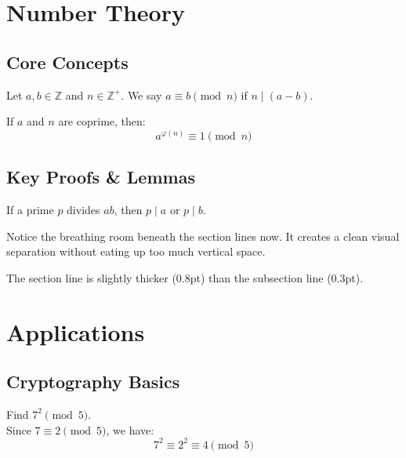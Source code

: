 \section{Number Theory}

\subsection{Core Concepts}

\begin{definition}
    Let $a, b \in \mathbb{Z}$ and $n \in \mathbb{Z}^+$. We say $a \equiv b \pmod n$ if $n \mid (a-b)$.
\end{definition}

\begin{theorem}
    If $a$ and $n$ are coprime, then:
    $$ a^{\varphi(n)} \equiv 1 \pmod n $$
\end{theorem}

\subsection{Key Proofs \& Lemmas}

\begin{lemma}
    If a prime $p$ divides $ab$, then $p \mid a$ or $p \mid b$.
\end{lemma}

\begin{remark}
    Notice the breathing room beneath the section lines now. It creates a clean visual separation without eating up too much vertical space.
\end{remark}

\begin{important}
    The section line is slightly thicker (0.8pt) than the subsection line (0.3pt).
\end{important}

\section{Applications}

\subsection{Cryptography Basics}

\begin{example}
    Find $7^2 \pmod 5$. \\
    Since $7 \equiv 2 \pmod 5$, we have:
    $$ 7^2 \equiv 2^2 \equiv 4 \pmod 5 $$
\end{example}

